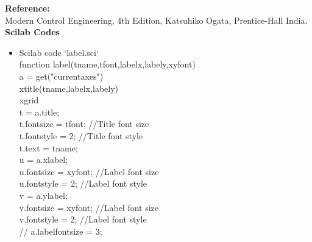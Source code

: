 \documentclass[12pt,prb]{article}
\begin{document}
\newpage
\textbf{Reference:} \\
Modern Control Engineering, 4th Edition, Katsuhiko Ogata, Prentice-Hall India.\\
\newpage
\textbf{Scilab Codes}
\begin{itemize}

\item Scilab code \textquoteleft label.sci\textquoteleft
\vspace{0.5cm}  \\ \textrightarrow function label(tname,tfont,labelx,labely,xyfont)\\
\textrightarrow a = get("current\textunderscore axes")\\
\textrightarrow xtitle(tname,labelx,labely)\\
\textrightarrow xgrid\\
\textrightarrow t = a.title;\\
\textrightarrow t.font\textunderscore size = tfont; //Title font size\\
\textrightarrow t.font\textunderscore style = 2; //Title font style\\
\textrightarrow t.text = tname;\\

\textrightarrow u = a.x\textunderscore label;\\
\textrightarrow u.font\textunderscore size = xyfont; //Label font size\\
\textrightarrow u.font\textunderscore style = 2; //Label font style\\

\textrightarrow v = a.y\textunderscore label;\\
\textrightarrow v.font\textunderscore size = xyfont; //Label font size\\
\textrightarrow v.font\textunderscore style = 2; //Label font style\\

\textrightarrow // a.label\textunderscore font\textunderscore size = 3;\\


\end{itemize}
\end{document}
